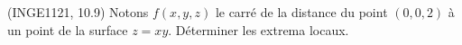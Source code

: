 
\begin{exercice}\label{exoDerrivePartielle-0010}

	(INGE1121, 10.9) Notons $f(x,y,z)$ le carré de la distance du point $(0,0,2)$ à un point de la surface $z=xy$. Déterminer les extrema locaux.

\end{exercice}
